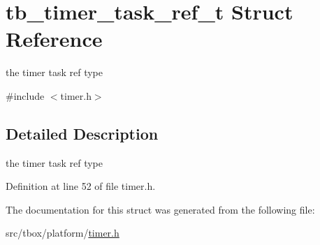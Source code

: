 \hypertarget{structtb__timer__task__ref__t}{\section{tb\-\_\-timer\-\_\-task\-\_\-ref\-\_\-t Struct Reference}
\label{structtb__timer__task__ref__t}
}


the timer task ref type  




{\ttfamily \#include $<$timer.\-h$>$}



\subsection{Detailed Description}
the timer task ref type 

Definition at line 52 of file timer.\-h.



The documentation for this struct was generated from the following file\-:\begin{DoxyCompactItemize}
\item 
src/tbox/platform/\hyperlink{timer_8h}{timer.\-h}\end{DoxyCompactItemize}
